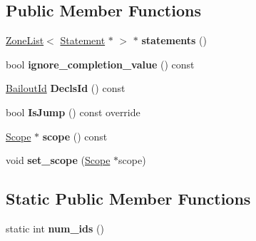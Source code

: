 \subsection*{Public Member Functions}
\begin{DoxyCompactItemize}
\item 
\hyperlink{classv8_1_1internal_1_1_zone_list}{Zone\+List}$<$ \hyperlink{classv8_1_1internal_1_1_statement}{Statement} $\ast$ $>$ $\ast$ {\bfseries statements} ()\hypertarget{classv8_1_1internal_1_1_block_aa88d659bd6ab851e246456b818abe0da}{}\label{classv8_1_1internal_1_1_block_aa88d659bd6ab851e246456b818abe0da}

\item 
bool {\bfseries ignore\+\_\+completion\+\_\+value} () const \hypertarget{classv8_1_1internal_1_1_block_add2a87093c05a95295a08a9d219c9eea}{}\label{classv8_1_1internal_1_1_block_add2a87093c05a95295a08a9d219c9eea}

\item 
\hyperlink{classv8_1_1internal_1_1_bailout_id}{Bailout\+Id} {\bfseries Decls\+Id} () const \hypertarget{classv8_1_1internal_1_1_block_a046ae0353b396f962b9793075ab61584}{}\label{classv8_1_1internal_1_1_block_a046ae0353b396f962b9793075ab61584}

\item 
bool {\bfseries Is\+Jump} () const  override\hypertarget{classv8_1_1internal_1_1_block_a2fc1bf44e65241b6e20c3f367affd19e}{}\label{classv8_1_1internal_1_1_block_a2fc1bf44e65241b6e20c3f367affd19e}

\item 
\hyperlink{classv8_1_1internal_1_1_scope}{Scope} $\ast$ {\bfseries scope} () const \hypertarget{classv8_1_1internal_1_1_block_a446a5e053facbae0e6120244c524b5b9}{}\label{classv8_1_1internal_1_1_block_a446a5e053facbae0e6120244c524b5b9}

\item 
void {\bfseries set\+\_\+scope} (\hyperlink{classv8_1_1internal_1_1_scope}{Scope} $\ast$scope)\hypertarget{classv8_1_1internal_1_1_block_a4a47d745c43ea05ebb7caeb1c69525b3}{}\label{classv8_1_1internal_1_1_block_a4a47d745c43ea05ebb7caeb1c69525b3}

\end{DoxyCompactItemize}
\subsection*{Static Public Member Functions}
\begin{DoxyCompactItemize}
\item 
static int {\bfseries num\+\_\+ids} ()\hypertarget{classv8_1_1internal_1_1_block_aece6f77d650f961b7be14c028b03c0a5}{}\label{classv8_1_1internal_1_1_block_aece6f77d650f961b7be14c028b03c0a5}

\end{DoxyCompactItemize}
